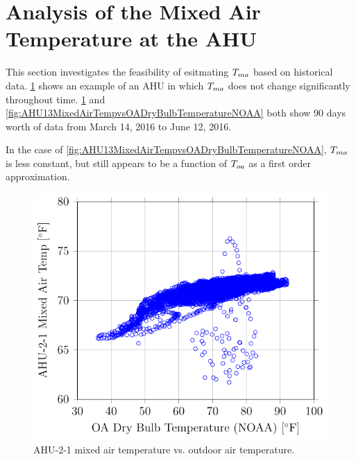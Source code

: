 \section{Analysis of the Mixed Air Temperature at the AHU}

This section investigates the feasibility of esitmating \(T_{ma}\) based on historical data. \figref{} \ref{fig:AHU21MixedAirTempvsOADryBulbTemperatureNOAA} shows an example of an AHU in which \(T_{ma}\) does not change significantly throughout time. \figref{} \ref{fig:AHU21MixedAirTempvsOADryBulbTemperatureNOAA} and \ref{fig:AHU13MixedAirTempvsOADryBulbTemperatureNOAA} both show 90 days worth of data from March 14, 2016 to June 12, 2016. 

In the case of \figref{} \ref{fig:AHU13MixedAirTempvsOADryBulbTemperatureNOAA}, \(T_{ma}\) is less constant, but still appears to be a function of \(T_{oa}\) as a first order approximation. 


\begin{figure}
\centering
\includegraphics[]{Plots/2016-06-13-1441-AHU21MixedAirTempvsOADryBulbTemperatureNOAA.pdf}
\caption{AHU-2-1 mixed air temperature vs. outdoor air temperature.}
\label{fig:AHU21MixedAirTempvsOADryBulbTemperatureNOAA}
\end{figure}


